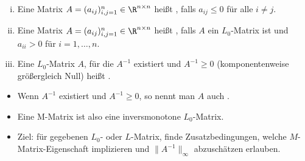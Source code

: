 \begin{df} \label{2.27}
	\begin{enumerate}[i)]
		\item
			Eine Matrix $A = (a_{ij})_{i,j=1}^n \in \R^{n\times n}$ heißt , falls $a_{ij} \le 0$ für alle $i \neq j$.
		\item
			Eine Matrix $A = (a_{ij})_{i,j=1}^n \in \R^{n\times n}$ heißt , falls $A$ ein $L_0$-Matrix ist und $a_{ii} > 0$ für $i= 1, \dotsc, n$.
		\item
			Eine $L_0$-Matrix $A$, für die $A^{-1}$ existiert und $A^{-1} \ge 0$ (komponentenweise größergleich Null) heißt .
	\end{enumerate}
	\begin{note}
		\begin{itemize}
			\item
				Wenn $A^{-1}$ existiert und $A^{-1} \ge 0$, so nennt man $A$ auch .
			\item
				Eine M-Matrix ist also eine inversmonotone $L_0$-Matrix.
			\item
				Ziel: für gegebenen $L_0$- oder $L$-Matrix, finde Zusatzbedingungen, welche $M$-Matrix-Eigenschaft implizieren und $\|A^{-1}\|_\infty$ abzuschätzen erlauben.
		\end{itemize}
	\end{note}
\end{df}

